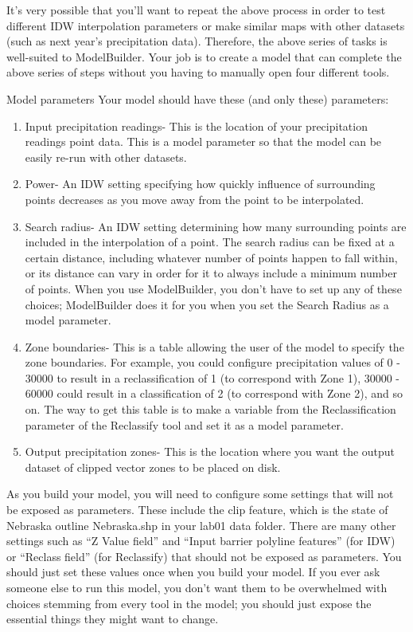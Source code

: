 \documentclass[]{article}
\begin{document}
It's very possible that you'll want to repeat the above process in order
to test different IDW interpolation parameters or make similar maps with
other datasets (such as next year's precipitation data). Therefore, the
above series of tasks is well-suited to ModelBuilder. Your job is to
create a model that can complete the above series of steps without you
having to manually open four different tools.

Model parameters Your model should have these (and only these)
parameters:

\begin{enumerate}
\def\labelenumi{\arabic{enumi}.}
\item
  Input precipitation readings- This is the location of your
  precipitation readings point data. This is a model parameter so that
  the model can be easily re-run with other datasets.
\item
  Power- An IDW setting specifying how quickly influence of surrounding
  points decreases as you move away from the point to be interpolated.
\item
  Search radius- An IDW setting determining how many surrounding points
  are included in the interpolation of a point. The search radius can be
  fixed at a certain distance, including whatever number of points
  happen to fall within, or its distance can vary in order for it to
  always include a minimum number of points. When you use ModelBuilder,
  you don't have to set up any of these choices; ModelBuilder does it
  for you when you set the Search Radius as a model parameter.
\item
  Zone boundaries- This is a table allowing the user of the model to
  specify the zone boundaries. For example, you could configure
  precipitation values of 0 - 30000 to result in a reclassification of 1
  (to correspond with Zone 1), 30000 - 60000 could result in a
  classification of 2 (to correspond with Zone 2), and so on. The way to
  get this table is to make a variable from the Reclassification
  parameter of the Reclassify tool and set it as a model parameter.
\item
  Output precipitation zones- This is the location where you want the
  output dataset of clipped vector zones to be placed on disk.
\end{enumerate}

As you build your model, you will need to configure some settings that
will not be exposed as parameters. These include the clip feature, which
is the state of Nebraska outline Nebraska.shp in your lab01 data folder.
There are many other settings such as ``Z Value field'' and ``Input
barrier polyline features'' (for IDW) or ``Reclass field'' (for
Reclassify) that should not be exposed as parameters. You should just
set these values once when you build your model. If you ever ask someone
else to run this model, you don't want them to be overwhelmed with
choices stemming from every tool in the model; you should just expose
the essential things they might want to change.
\end{document}
